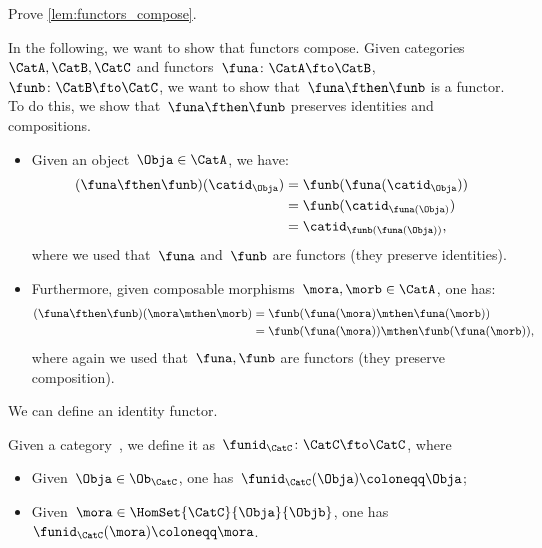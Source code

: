 \begin{exercise}
	Prove \cref{lem:functors_compose}.
\end{exercise}
\begin{solution}
	In the following, we want to show that functors compose.
	Given categories~$\CatA,\CatB,\CatC$ and functors~$\funa\colon \CatA\fto \CatB$,~$\funb \colon \CatB\fto \CatC$, we want to show that~$\funa\fthen\funb$ is a functor.
	To do this, we show that~$\funa\fthen\funb$ preserves identities and compositions.
	\begin{itemize}
		\item Given an object~$\Obja\in \CatA$, we have:
		      \begin{equation*}
			      \begin{aligned}
				      (\funa\fthen\funb)(\catid_\Obja)
				       & =\funb(\funa(\catid_\Obja))    \\
				       & =\funb(\catid_{\funa(\Obja)})  \\
				       & =\catid_{\funb(\funa(\Obja))},
			      \end{aligned}
		      \end{equation*}
		      where we used that~$\funa$ and~$\funb$ are functors (they preserve identities).
		\item Furthermore, given composable morphisms~$\mora,\morb\in \CatA$, one has:
		      \begin{equation*}
			      \begin{aligned}
				      (\funa\fthen\funb)(\mora\mthen\morb)
				       & =\funb(\funa(\mora)\mthen \funa(\morb))         \\
				       & =\funb(\funa(\mora))\mthen \funb(\funa(\morb)),
			      \end{aligned}
		      \end{equation*}
		      where again we used that~$\funa,\funb$ are functors (they preserve composition).
	\end{itemize}
\end{solution}

We can define an identity functor.

\begin{ctdefinition}
	\label{def:identity_functor}
	Given a category~\CatC, we define it as~$\funid_\CatC\colon \CatC \fto \CatC$, where
	\begin{itemize}
		\item Given~$\Obja\in \Ob_\CatC$, one has~$\funid_\CatC(\Obja)\coloneqq \Obja$;
		\item Given~$\mora \in \HomSet{\CatC}{\Obja}{\Objb}$, one has~$\funid_\CatC(\mora)\coloneqq \mora$.
	\end{itemize}
\end{ctdefinition}

